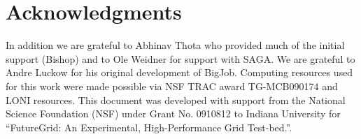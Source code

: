 \documentclass{sig-alternate}
\begin{document}
\section{Acknowledgments}
In addition we are grateful to Abhinav Thota who provided much of the
initial support (Bishop) and to Ole Weidner for support with SAGA. We
are grateful to Andre Luckow for his original development of BigJob.
Computing resources used for this work were made possible via NSF TRAC
award TG-MCB090174 and LONI resources.  This document was developed
with support from the National Science Foundation (NSF) under Grant
No.  0910812 to Indiana University for ``FutureGrid: An Experimental,
High-Performance Grid Test-bed.''.



\end{document}

